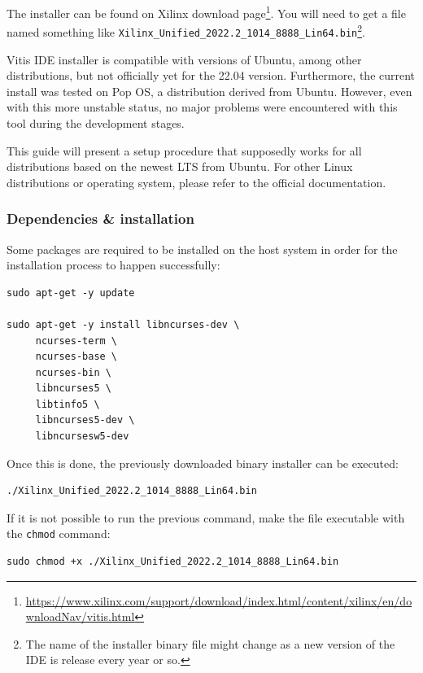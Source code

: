 \documentclass[10pt]{article}
\begin{document}
The installer can be found on Xilinx download page\footnote{\url{https://www.xilinx.com/support/download/index.html/content/xilinx/en/downloadNav/vitis.html}}. You will need to get
a file named something like \texttt{Xilinx\_Unified\_2022.2\_1014\_8888\_Lin64.bin}\footnote{The name of the installer binary file might change as a new version of
the IDE is release every year or so.}.

Vitis IDE installer is compatible with versions of Ubuntu, among other distributions,
but not officially yet for the 22.04 version.
Furthermore, the current install was tested on Pop OS, a distribution derived from Ubuntu.
However, even with this more unstable status, no major problems were encountered
with this tool during the development stages.

This guide will present a setup procedure that supposedly works for all distributions based on the newest
LTS from Ubuntu. For other Linux distributions or operating system, please refer to the official documentation.

\subsubsection{Dependencies \& installation}
\label{sec:orgb661b15}
Some packages are required to be installed on the host system
in order for the installation process to happen successfully:

\begin{verbatim}
sudo apt-get -y update

sudo apt-get -y install libncurses-dev \
     ncurses-term \
     ncurses-base \
     ncurses-bin \
     libncurses5 \
     libtinfo5 \
     libncurses5-dev \
     libncursesw5-dev
\end{verbatim}

Once this is done, the previously downloaded binary installer can be executed:

\begin{verbatim}
./Xilinx_Unified_2022.2_1014_8888_Lin64.bin
\end{verbatim}

If it is not possible to run the previous command, make the file executable with the \texttt{chmod} command:

\begin{verbatim}
sudo chmod +x ./Xilinx_Unified_2022.2_1014_8888_Lin64.bin
\end{verbatim}
\end{document}
